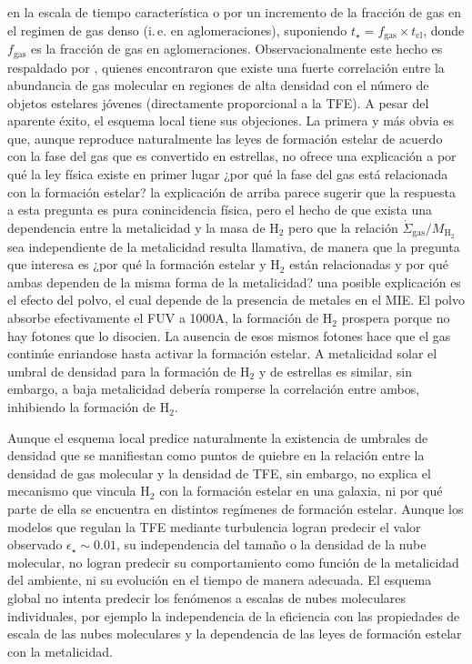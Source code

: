 \documentclass{article}
\begin{document}
\begin{description}
en la escala de tiempo característica o por un incremento de la fracción de gas en el regimen de gas
denso (i.\,e. en aglomeraciones), suponiendo $t_\star=f_\text{gas}\times t_\text{cl}$, donde
$f_\text{gas}$ es la fracción de gas en aglomeraciones. Observacionalmente este hecho es respaldado
por \citet{Lada2010}, quienes encontraron que existe una fuerte correlación entre la abundancia de
gas molecular en regiones de alta densidad con el número de objetos estelares jóvenes (directamente
proporcional a la TFE).
A pesar del aparente éxito, el esquema local tiene sus objeciones. La primera y más obvia es que,
aunque reproduce naturalmente las leyes de formación estelar de acuerdo con la fase del gas que es
convertido en estrellas, no ofrece una explicación a por qué la ley física existe en primer lugar
¿por qué la fase del gas está relacionada con la formación estelar? la explicación de arriba parece
sugerir que la respuesta a esta pregunta es pura conincidencia física, pero el hecho de que exista
una dependencia entre la metalicidad y la masa de H$_2$ pero que la relación
$\dot{\Sigma}_\text{gas} / M_{\text{H}_2}$ sea independiente de la metalicidad resulta llamativa, de
manera que la pregunta que interesa es ¿por qué la formación estelar y H$_2$ están relacionadas y
por qué ambas dependen de la misma forma de la metalicidad? una posible explicación es el efecto del
polvo, el cual depende de la presencia de metales en el MIE. El polvo absorbe efectivamente el FUV a
1000A, la formación de H$_2$ prospera porque no hay fotones que lo disocien. La ausencia de esos
mismos fotones hace que el gas continúe enriandose hasta activar la formación estelar. A metalicidad
solar el umbral de densidad para la formación de H$_2$ y de estrellas es similar, sin embargo, a
baja metalicidad debería romperse la correlación entre ambos, inhibiendo la formación de H$_2$.

Aunque el esquema local predice naturalmente la existencia de umbrales de densidad que se
manifiestan como puntos de quiebre en la relación entre la densidad de gas molecular y la densidad
de TFE,
sin embargo, no explica el mecanismo que vincula H$_2$ con la formación estelar en una galaxia, ni
por qué parte de ella se encuentra en distintos regímenes de formación estelar. Aunque los modelos
que regulan la TFE mediante turbulencia logran predecir el valor observado $\epsilon_\star\sim0.01$,
su independencia del tamaño o la densidad de la nube molecular, no logran predecir su comportamiento
como función de la metalicidad del ambiente, ni su evolución en el tiempo de manera adecuada. El
esquema global no intenta predecir los fenómenos a escalas de nubes moleculares individuales, por
ejemplo la independencia de la eficiencia con las propiedades de escala de las nubes moleculares y
la dependencia de las leyes de formación estelar con la metalicidad.


\end{description}
\end{document}
